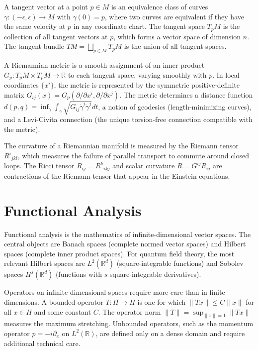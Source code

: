 \documentclass[11pt, twoside, openright]{book}
\theoremstyle{dotted}
\theoremstyle{definition}
\begin{document}
A tangent vector at a point $p \in M$ is an equivalence class of curves
$\gamma: (-\epsilon, \epsilon) \to M$ with $\gamma(0) = p$, where two curves are
equivalent if they have the same velocity at $p$ in any coordinate chart. The
tangent space $T_pM$ is the collection of all tangent vectors at $p$, which forms
a vector space of dimension $n$. The tangent bundle $TM = \bigsqcup_{p \in M} T_pM$
is the union of all tangent spaces.

A Riemannian metric is a smooth assignment of an inner product $G_p: T_pM \times
T_pM \to \mathbb{R}$ to each tangent space, varying smoothly with $p$. In local
coordinates $\{x^i\}$, the metric is represented by the symmetric positive-definite
matrix $G_{ij}(x) = G_p(\partial/\partial x^i, \partial/\partial x^j)$. The
metric determines a distance function $d(p,q) = \inf_\gamma \int_\gamma \sqrt{G_{ij}\dot\gamma^i\dot\gamma^j}dt$,
a notion of geodesics (length-minimizing curves), and a Levi-Civita connection
(the unique torsion-free connection compatible with the metric).

The curvature of a Riemannian manifold is measured by the Riemann tensor
$R^i{}_{jkl}$, which measures the failure of parallel transport to commute around
closed loops. The Ricci tensor $R_{ij} = R^k{}_{ikj}$ and scalar curvature
$R = G^{ij}R_{ij}$ are contractions of the Riemann tensor that appear in the
Einstein equations.

\section{Functional Analysis}

Functional analysis is the mathematics of infinite-dimensional vector spaces. The
central objects are Banach spaces (complete normed vector spaces) and Hilbert
spaces (complete inner product spaces). For quantum field theory, the most
relevant Hilbert spaces are $L^2(\mathbb{R}^d)$ (square-integrable functions) and
Sobolev spaces $H^s(\mathbb{R}^d)$ (functions with $s$ square-integrable derivatives).

Operators on infinite-dimensional spaces require more care than in finite dimensions.
A bounded operator $T: H \to H$ is one for which $\|Tx\| \leq C\|x\|$ for all
$x \in H$ and some constant $C$. The operator norm $\|T\| = \sup_{\|x\|=1}\|Tx\|$
measures the maximum stretching. Unbounded operators, such as the momentum operator
$p = -i\partial_x$ on $L^2(\mathbb{R})$, are defined only on a dense domain and
require additional technical care.
\end{document}
